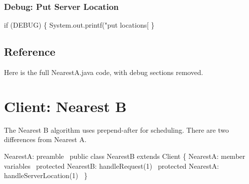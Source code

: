 \subsection{Debug: Put Server Location}

\nwenddocs{}\endmoddef\nwstartdeflinemarkup{}\nwenddeflinemarkup
if (DEBUG) \{
  System.out.printf("put locations[%
\}
\nwendcode{}\nwdocspar

\section{Reference}

Here is the full NearestA.java code, with debug sections removed.

\nwenddocs{}\chapter{Client: Nearest B}
\label{client-nearest-b}

The Nearest B algorithm uses prepend-after for scheduling. There are two
differences from Nearest A.

\nwenddocs{}\endmoddef\nwstartdeflinemarkup\nwenddeflinemarkup
\LA{}NearestA: preamble~{\nwtagstyle{}}\RA{}
public class NearestB extends Client \{
  \LA{}NearestA: member variables~{\nwtagstyle{}}\RA{}
  protected \LA{}NearestB: handleRequest(1)~{\nwtagstyle{}}\RA{}
  protected \LA{}NearestA: handleServerLocation(1)~{\nwtagstyle{}}\RA{}
\}
\nwendcode{}\nwdocspar

